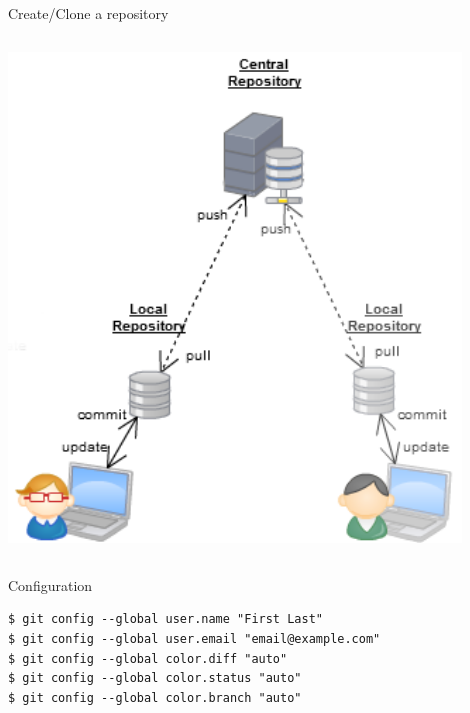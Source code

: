 \begin{frame}[fragile]{Create/Clone a repository}
\begin{columns}
\begin{column}{0.4\textwidth}
\begin{center}
{					\includegraphics[width=0.9\textwidth]{clone.png}
				}
			\end{center}
		\end{column}
	\end{columns}
\end{frame}


\begin{frame}[fragile]{Configuration}
	\begin{lstlisting}
$ git config --global user.name "First Last"
$ git config --global user.email "email@example.com"
$ git config --global color.diff "auto"
$ git config --global color.status "auto"
$ git config --global color.branch "auto"
	\end{lstlisting}
\end{frame}


